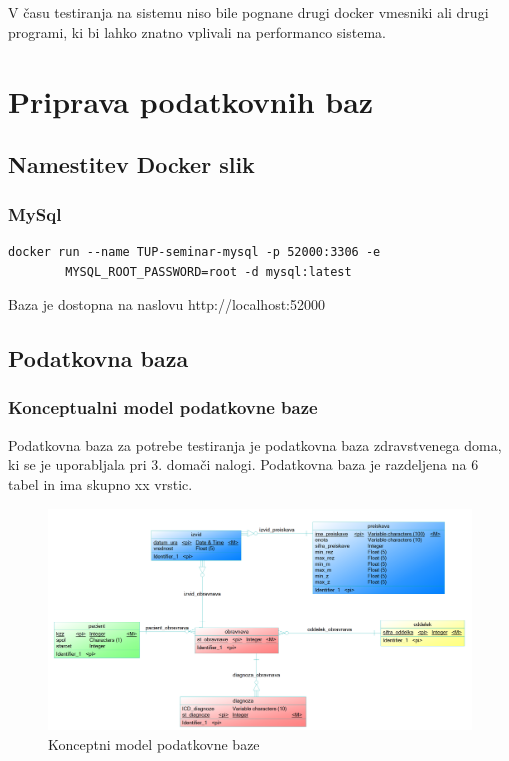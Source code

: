 \documentclass[a4paper,12pt]{report}
\begin{document}
\paragraph{}
V času testiranja na sistemu niso bile pognane drugi docker vmesniki ali drugi programi, ki bi lahko znatno vplivali na performanco sistema.

\chapter{Priprava podatkovnih baz}

\section{Namestitev Docker slik}
\subsection{MySql}
\begin{lstlisting}
docker run --name TUP-seminar-mysql -p 52000:3306 -e 
        MYSQL_ROOT_PASSWORD=root -d mysql:latest
\end{lstlisting}

Baza je dostopna na naslovu http://localhost:52000

\section{Podatkovna baza}
\subsection{Konceptualni model podatkovne baze}
Podatkovna baza za potrebe testiranja je podatkovna baza zdravstvenega doma, ki se je uporabljala pri 3. domači nalogi.
Podatkovna baza je razdeljena na 6 tabel in ima skupno xx vrstic.

\begin{figure}[htb]
    \noindent\includegraphics[width=\linewidth]{./pics/konceptni.png}
    \caption{Konceptni model podatkovne baze}
 \end{figure}
\end{document}
